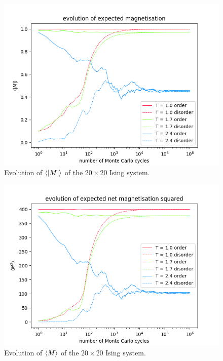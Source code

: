 \documentclass[nofootinbib,reprint,english]{revtex4-1}
\begin{document}
\begin{figure}
\centering
\includegraphics[scale=0.5]{../output/figures/experiment2/magnetisation.png}
\caption{Evolution of \(\expval{|M|}\) of the \(20\times20\) Ising system.}\label{fig:experiment2_magnetisation}
\end{figure}

\begin{figure}
\centering
\includegraphics[scale=0.5]{../output/figures/experiment2/netmagnetisation2.png}
\caption{Evolution of \(\expval{M}\) of the \(20\times20\) Ising system.}\label{fig:experiment2_netmagnetisation}
\end{figure}
\end{document}
